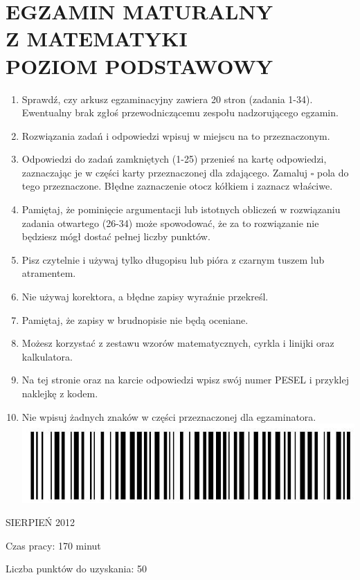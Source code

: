 \documentclass[10pt]{article}
\begin{document}
\section*{EGZAMIN MATURALNY \\
 Z MATEMATYKI \\
 POZIOM PODSTAWOWY}
\begin{enumerate}
  \item Sprawdź, czy arkusz egzaminacyjny zawiera 20 stron (zadania 1-34). Ewentualny brak zgłoś przewodniczącemu zespołu nadzorującego egzamin.
  \item Rozwiązania zadań i odpowiedzi wpisuj w miejscu na to przeznaczonym.
  \item Odpowiedzi do zadań zamkniętych (1-25) przenieś na kartę odpowiedzi, zaznaczając je w części karty przeznaczonej dla zdającego. Zamaluj \(\square\) pola do tego przeznaczone. Błędne zaznaczenie otocz kółkiem i zaznacz właściwe.
  \item Pamiętaj, że pominięcie argumentacji lub istotnych obliczeń w rozwiązaniu zadania otwartego (26-34) może spowodować, że za to rozwiązanie nie będziesz mógł dostać pełnej liczby punktów.
  \item Pisz czytelnie i używaj tylko długopisu lub pióra z czarnym tuszem lub atramentem.
  \item Nie używaj korektora, a błędne zapisy wyraźnie przekreśl.
  \item Pamiętaj, że zapisy w brudnopisie nie będą oceniane.
  \item Możesz korzystać z zestawu wzorów matematycznych, cyrkla i linijki oraz kalkulatora.
  \item Na tej stronie oraz na karcie odpowiedzi wpisz swój numer PESEL i przyklej naklejkę z kodem.
  \item Nie wpisuj żadnych znaków w części przeznaczonej dla egzaminatora.\\
\includegraphics[max width=\textwidth, center]{2024_11_21_6a8be49478f78d0689cfg-01}
\end{enumerate}

SIERPIEŃ 2012

Czas pracy: 170 minut

Liczba punktów do uzyskania: 50
\end{document}
